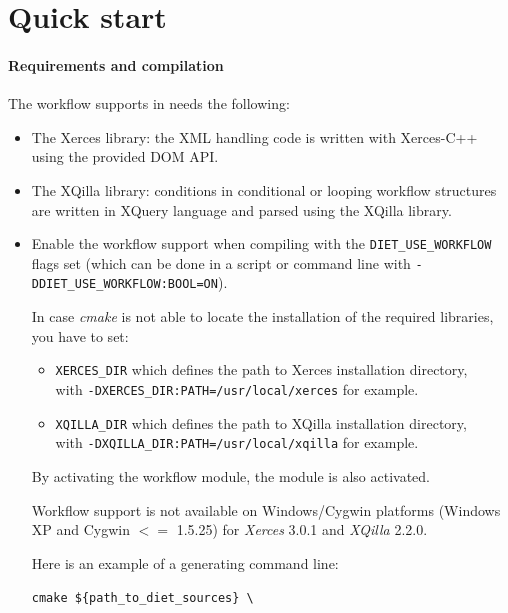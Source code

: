 \section{Quick start}

\paragraph{Requirements and compilation}

The workflow supports in \diet needs the following:

\begin{itemize}
\item The Xerces library: the XML handling code is written with Xerces-C++
  using the provided DOM API.
\item The XQilla library: conditions in conditional or looping workflow
  structures are written in XQuery language and parsed using the XQilla
  library.
\item Enable the workflow support when compiling \diet with the
  \texttt{DIET\_USE\_WORKFLOW} flags set (which can be done in a script or
  command line with \texttt{-DDIET\_USE\_WORKFLOW:BOOL=ON}).

  In case \textit{cmake} is not able to locate the installation of the required
  libraries, you have to set:

\begin{itemize}
\item \texttt{XERCES\_DIR} which defines the path to Xerces installation
  directory, \\ with \texttt{-DXERCES\_DIR:PATH=/usr/local/xerces} for example.
\item \texttt{XQILLA\_DIR} which defines the path to XQilla installation
  directory, \\with \texttt{-DXQILLA\_DIR:PATH=/usr/local/xqilla} for example.
\end{itemize}

\begin{remarque}
By activating the workflow module, the \dagda module is also activated.
\end{remarque}
\begin{remarque}
Workflow support is not available on Windows/Cygwin platforms (Windows XP and
Cygwin $<=$ 1.5.25) for \textit{Xerces} 3.0.1 and \textit{XQilla} 2.2.0.
\end{remarque}


Here is an example of a generating command line:

\verb|cmake ${path_to_diet_sources} \|


\end{itemize}

